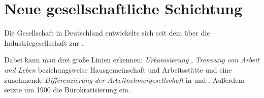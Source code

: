 \section{Neue gesellschaftliche Schichtung}
\label{neue-ges-schicht}

Die Gesellschaft in Deutschland entwickelte sich seit dem  über die Industriegesellschaft zur
.

Dabei kann man drei große Linien erkennen: \emph{Urbanisierung}
, \emph{Trennung von Arbeit und Leben}
beziehungsweise Hausgemeinschaft und Arbeitsstätte und eine zunehmende
\emph{Differenzierung der Arbeitnehmergesellschaft} in 
und . Außerdem setzte um 1900 die Bürokratisierung
ein.  

\endinput
